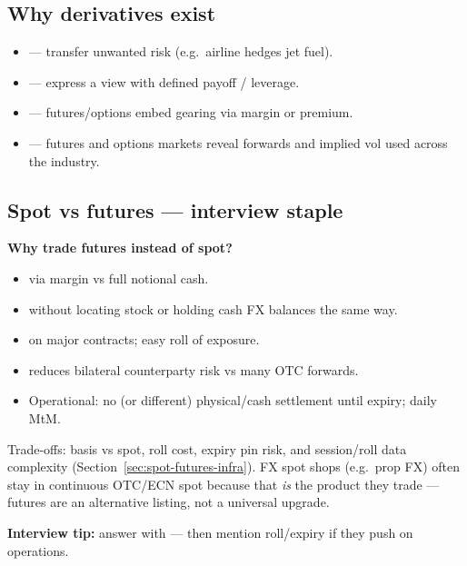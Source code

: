 \subsection{Why derivatives exist}
\label{subsec:why-derivatives}
\begin{itemize}
    \item {} --- transfer unwanted risk (e.g.\ airline hedges jet fuel).
    \item {} --- express a view with defined payoff / leverage.
    \item {} --- futures/options embed gearing via margin or premium.
    \item {} --- futures and options markets reveal forwards 
          and implied vol used across the industry.
\end{itemize}

\subsection{Spot vs futures --- interview staple}
\label{subsec:spot-vs-futures}
\textbf{Why trade futures instead of spot?}
\begin{itemize}
    \item {} via margin vs full notional cash.
    \item {} without locating stock or holding cash FX 
          balances the same way.
    \item {} on major contracts; easy roll of 
          exposure.
    \item {} reduces bilateral counterparty risk vs many OTC forwards.
    \item Operational: no (or different) physical/cash settlement until expiry; 
          daily MtM.
\end{itemize}
Trade-offs: basis vs spot, roll cost, expiry pin risk, and session/roll data complexity 
(Section~\ref{sec:spot-futures-infra}). FX spot shops (e.g.\ prop FX) often stay in 
continuous OTC/ECN spot because that \emph{is} the product they trade --- futures are 
an alternative listing, not a universal upgrade.

\par\noindent\textbf{Interview tip:} answer with  --- then mention roll/expiry if they push on operations.


